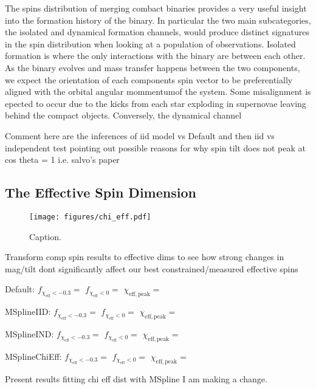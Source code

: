 The spins distribution of merging combact binaries provides a very useful insight into the formation history of the binary. In particular the two main subcategories, 
the isolated and dynamical formation channels, would produce distinct signatures in the spin distribution when looking at a population of observations. Isolated formation
is where the only interactions with the binary are between each other. As the binary evolves and mass transfer happens between the two components, we expect the orientation
of each components spin vector to be preferentially aligned with the orbital angular mommentumof the system. Some misalignment is epected to occur due to the kicks from 
each star exploding in supernovae leaving behind the compact objects. Conversely, the dynamical channel     

Comment here are the inferences of iid model vs Default and then iid vs independent test pointing out possible reasons for why spin tilt 
does not peak at cos theta = 1 i.e. salvo's paper

\subsection{The Effective Spin Dimension}
\begin{figure}
    \texttt{[image: figures/chi\_eff.pdf]}
    \caption{Caption.}
    \label{fig:chieff_dist}
\end{figure}

Transform comp spin results to effective dims to see how strong changes in mag/tilt dont significantly affect our best constrained/measured
effective spins

Default: $f_{\chi_\mathrm{eff}<-0.3} = $\result{$\CIPlusMinus{\macros[ChiEffective][default][FracBelowNeg0p3]}$} 
    $f_{\chi_\mathrm{eff}<0} = $\result{$\CIPlusMinus{\macros[ChiEffective][default][FracBelow0]}$} 
    $\chi_\mathrm{eff, peak} = $\result{$\CIPlusMinus{\macros[ChiEffective][default][PeakChiEff]}$} 

MSplineIID: $f_{\chi_\mathrm{eff}<-0.3} = $\result{$\CIPlusMinus{\macros[ChiEffective][iid][FracBelowNeg0p3]}$}
   $f_{\chi_\mathrm{eff}<0} = $\result{$\CIPlusMinus{\macros[ChiEffective][iid][FracBelow0]}$} 
   $\chi_\mathrm{eff, peak} = $\result{$\CIPlusMinus{\macros[ChiEffective][iid][PeakChiEff]}$} 

MSplineIND: $f_{\chi_\mathrm{eff}<-0.3} = $\result{$\CIPlusMinus{\macros[ChiEffective][ind][FracBelowNeg0p3]}$}
   $f_{\chi_\mathrm{eff}<0} = $\result{$\CIPlusMinus{\macros[ChiEffective][ind][FracBelow0]}$} 
   $\chi_\mathrm{eff, peak} = $\result{$\CIPlusMinus{\macros[ChiEffective][ind][PeakChiEff]}$} 

MSplineChiEff: $f_{\chi_\mathrm{eff}<-0.3} = $\result{$\CIPlusMinus{\macros[ChiEffective][chieff][FracBelowNeg0p3]}$}
    $f_{\chi_\mathrm{eff}<0} = $\result{$\CIPlusMinus{\macros[ChiEffective][chieff][FracBelow0]}$} 
    $\chi_\mathrm{eff, peak} = $\result{$\CIPlusMinus{\macros[ChiEffective][chieff][PeakChiEff]}$} 

Present results fitting chi eff dist with MSpline I am making a change. 